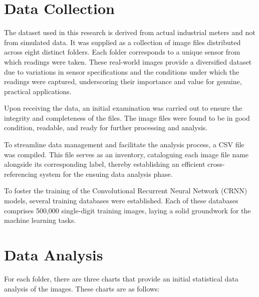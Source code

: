\section{Data Collection}

The dataset used in this research is derived from actual industrial meters and not from simulated data. It was supplied as a collection of image files distributed across eight distinct folders. Each folder corresponds to a unique sensor from which readings were taken. These real-world images provide a diversified dataset due to variations in sensor specifications and the conditions under which the readings were captured, underscoring their importance and value for genuine, practical applications.

Upon receiving the data, an initial examination was carried out to ensure the integrity and completeness of the files. The image files were found to be in good condition, readable, and ready for further processing and analysis.

To streamline data management and facilitate the analysis process, a CSV file was compiled. This file serves as an inventory, cataloguing each image file name alongside its corresponding label, thereby establishing an efficient cross-referencing system for the ensuing data analysis phase.

To foster the training of the Convolutional Recurrent Neural Network (CRNN) models, several training databases were established. Each of these databases comprises 500,000 single-digit training images, laying a solid groundwork for the machine learning tasks.


\newpage
\section{Data Analysis}

For each folder, there are three charts that provide an initial statistical data analysis of the images. These charts are as follows:


